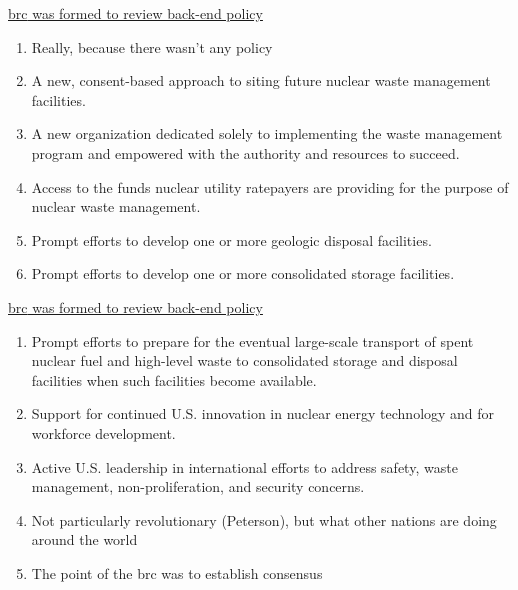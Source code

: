 \documentclass[aspectratio=1610,pdftex,dvipsnames,compress,xcolor={dvipsnames}]{beamer}
\newcommand{\acl}{\acrlong} %
\newcommand{\acs}{\acrshort} %
\begin{document}
\addtocounter{framenumber}{-3} 
\begin{frame}{\href{https://uidaho.pressbooks.pub/nuclearengineering/chapter/back-end-of-the-fuel-cycle/}{\acl{brc} was formed to review back-end policy}}
    \begin{enumerate}[series=blue,topsep=0pt,itemsep=21pt,leftmargin=*,label=(\arabic*)]
        \item[]Really, because there wasn't any policy
            \vspace{0.05in}
        \item A new, consent-based approach to siting future nuclear waste management facilities.
        \item A new organization dedicated solely to implementing the waste management program and empowered with the authority and resources to succeed.
        \item Access to the funds nuclear utility ratepayers are providing for the purpose of nuclear waste management.
        \item Prompt efforts to develop one or more geologic disposal facilities.
        \item Prompt efforts to develop one or more consolidated storage facilities.
    \end{enumerate}
\end{frame}


\begin{frame}{\href{https://uidaho.pressbooks.pub/nuclearengineering/chapter/back-end-of-the-fuel-cycle/}{\acl{brc} was formed to review back-end policy}}
    \begin{enumerate}[resume=blue,topsep=0pt,itemsep=21pt,leftmargin=*,label=(\arabic*)]
        \item Prompt efforts to prepare for the eventual large-scale transport of spent nuclear fuel and high-level waste to consolidated storage and disposal facilities when such facilities become available.
        \item Support for continued U.S. innovation in nuclear energy technology and for workforce development.
        \item Active U.S. leadership in international efforts to address safety, waste management, non-proliferation, and
            \vspace{0.05in}
security concerns.
        \item[] Not particularly revolutionary (Peterson), but what other nations are doing around the world
        \item[] The point of the \acs{brc} was to establish consensus
    \end{enumerate}
\end{frame}
\end{document}
